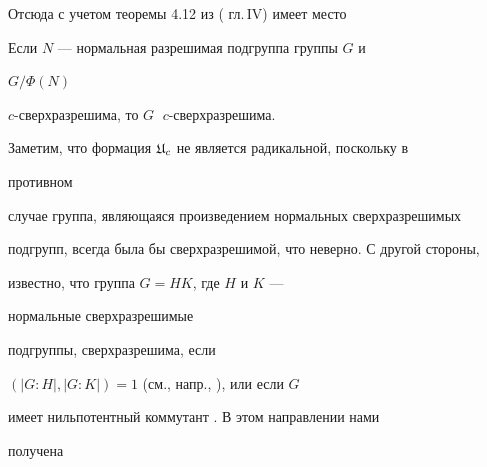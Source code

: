 Отсюда с учетом теоремы 4.12 из (\cite{Doe} гл.\,IV) имеет место





\begin{cornonum}


Если $N$ --- нормальная разрешимая подгруппа группы $G$ и


$G/\Phi(N)\;$


$c$-сверх\-разрешима, то $G\;$ $c$-сверх\-разрешима.


\end{cornonum}





Заметим, что формация $\frak U_c$ не является радикальной, поскольку в


противном


случае группа, являющаяся произведением нормальных сверхразрешимых


подгрупп, всегда была бы сверхразрешимой, что неверно. С другой стороны,


известно, что группа $G=HK$, где $H$ и $K$ ---


нормальные сверхразрешимые


подгруппы, сверхразрешима, если


$(|G{:}H|,|G{:}K|)=1$ (см., напр., \cite{She}), или если $G$


имеет нильпотентный коммутант \cite{Bae}. В этом направлении нами


получена





